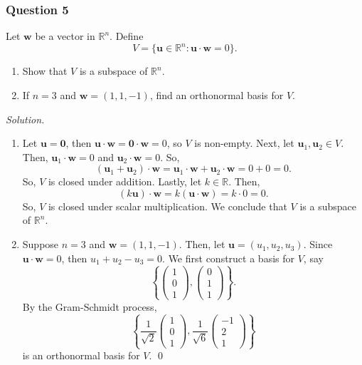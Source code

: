 \documentclass[12pt]{article}
\begin{document}
\subsubsection*{Question 5}
Let \(\mathbf{w}\) be a vector in \(\mathbb{R}^n\). Define
\[
V = \{\mathbf{u} \in \mathbb{R}^n : \mathbf{u}\cdot \mathbf{w} = 0\}.
\]
\begin{enumerate}[label=\textbf{(\alph*)}]
\itemsep 0em
    \item Show that \(V\) is a subspace of \(\mathbb{R}^n\).
    \item If \(n=3\) and \(\mathbf{w}=(1,1,-1)\), find an orthonormal basis for \(V\).
\end{enumerate}
\noindent\emph{Solution.}
\begin{enumerate}[label=\textbf{(\alph*)}]
    \itemsep 0em
    \item Let $\mathbf{u}=\mathbf{0}$, then $\mathbf{u}\cdot \mathbf{w}=\mathbf{0}\cdot\mathbf{w}=0$, so $V$ is non-empty.
    \newline
    \newline Next, let $\mathbf{u}_1,\mathbf{u}_2\in V$. Then, $\mathbf{u}_1\cdot \mathbf{w}=0$ and $\mathbf{u}_2\cdot \mathbf{w}=0$. So, \[\left(\mathbf{u}_1+\mathbf{u}_2\right)\cdot\mathbf{w}=\mathbf{u}_1\cdot\mathbf{w}+\mathbf{u}_2\cdot\mathbf{w}=0+0=0.\]
    So, $V$ is closed under addition. Lastly, let $k\in\mathbb{R}$. Then, \[\left(k\mathbf{u}\right)\cdot\mathbf{w}=k\left(\mathbf{u}\cdot\mathbf{w}\right)=k\cdot 0 =0.\]
    So, $V$ is closed under scalar multiplication. We conclude that $V$ is a subspace of $\mathbb{R}^n$.
    \item Suppose $n=3$ and $\mathbf{w}=\left(1,1,-1\right)$. Then, let $\mathbf{u}=\left(u_1,u_2,u_3\right)$. Since $\mathbf{u}\cdot\mathbf{w}=0$, then $u_1+u_2-u_3=0$. We first construct a basis for $V$, say \[\left\{\begin{pmatrix}
        1\\0\\1
    \end{pmatrix},\begin{pmatrix}
        0\\1\\1
    \end{pmatrix}\right\}.\]
    By the Gram-Schmidt process, \[\left\{\frac{1}{\sqrt{2}}\begin{pmatrix}
        1\\0\\1
    \end{pmatrix},\frac{1}{\sqrt{6}}\begin{pmatrix}
        -1\\2\\1
    \end{pmatrix}\right\}\]
    is an orthonormal basis for $V$. \qed 
\end{enumerate}
\end{document}
